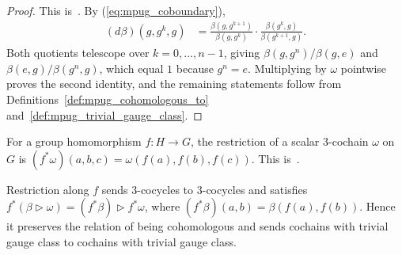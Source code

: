 \begin{proof}\leanok
    This is~\cite[``Gauge invariance of the cyclic
        invariant'']{QICLean2026Blueprint}.
    By (\ref{eq:mpug_coboundary}),
    \begin{align}
        (d\beta)(g,g^k,g)
         & =\frac{\beta(g,g^{k+1})}{\beta(g,g^k)}\cdot
        \frac{\beta(g^k,g)}{\beta(g^{k+1},g)}.
    \end{align}
    Both quotients telescope over $k=0,\dots,n-1$, giving
    $\beta(g,g^n)/\beta(g,e)$ and $\beta(e,g)/\beta(g^n,g)$, which equal $1$
    because $g^n=e$. Multiplying by $\omega$ pointwise proves the second
    identity, and the remaining statements follow from
    Definitions~\ref{def:mpug_cohomologous_to}
    and~\ref{def:mpug_trivial_gauge_class}.
\end{proof}

\begin{definition}
    \label{def:mpug_cochain_restriction}
    \leanok
    For a group homomorphism $f\colon H\to G$, the restriction of a scalar
    $3$-cochain $\omega$ on $G$ is
    $(f^*\omega)(a,b,c)=\omega(f(a),f(b),f(c))$.
    This is~\cite[``Restriction of scalar
        three-cochains'']{QICLean2026Blueprint}.
\end{definition}

\begin{lemma}
    \label{thm:mpug_cochain_restriction}
    \leanok
    Restriction along $f$ sends $3$-cocycles to $3$-cocycles and satisfies
    $f^*(\beta\mathbin{\triangleright}\omega)
        =(f^*\beta)\mathbin{\triangleright}f^*\omega$, where
    $(f^*\beta)(a,b)=\beta(f(a),f(b))$. Hence it preserves the relation of
    being cohomologous and sends cochains with trivial gauge class to
    cochains with trivial gauge class.
\end{lemma}

